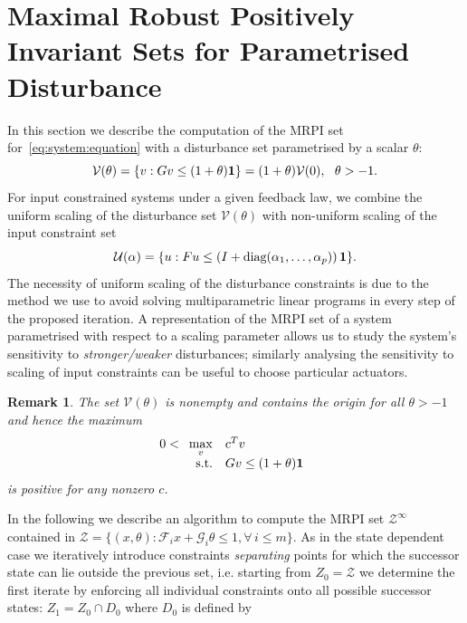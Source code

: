 \documentclass[letterpaper, 10pt, conference]{ieeeconf} %
\newtheorem{rem}[thm]{Remark}
\begin{document}
\section{Maximal Robust Positively Invariant Sets for Parametrised Disturbance}\label{sec:MRPI:parametrised}
%
%
In this section we describe the computation of the MRPI set for~\eqref{eq:system:equation} with a disturbance set parametrised by a scalar $\theta$:
\[
\mathcal V(\theta) = \{v: Gv\leq(1+\theta){\bf{1}}\} 
= (1+\theta)\mathcal V(0), \ \ \theta>-1.
\]
For input constrained systems under a given feedback law, we combine the uniform scaling of 
the disturbance set $\mathcal V(\theta)$ with non-uniform scaling of the input constraint set
\[
\mathcal U({\bf{\alpha}}) = \{u: Fu\leq\left(I+\text{diag}(\alpha_1,\dots,\alpha_p)\right){\bf{1}}\}.
\]
The necessity of uniform scaling of the disturbance constraints is due to the method we use to avoid
solving multiparametric linear programs in every step of the proposed iteration.
A representation of the MRPI set of a system parametrised with respect to a scaling parameter allows us
to study the system's sensitivity to \emph{stronger/weaker} disturbances; similarly analysing the sensitivity to scaling of input 
constraints can be useful to choose particular actuators.
%
\begin{rem}
The set $\mathcal V(\theta)$ is nonempty and contains the origin for all $\theta>-1$ and hence the 
maximum
%
\[
0<\begin{array}[t]{rl}
\displaystyle\max_v & c^T v\\
\text{s.t.}& Gv \leq (1+\theta){\bf{1}}
\end{array}
\]
%
is positive for any nonzero $c$.
\end{rem}
%
In the following we describe an algorithm to compute the MRPI set $\mathcal Z^\infty$ contained in 
$\mathcal Z = \{(x,\theta):\mathcal F_i x+\mathcal G_i\theta \leq 1,\forall\, i\leq m\}$.
As in the state dependent case we iteratively introduce constraints \emph{separating} points
for which the successor state can lie outside the previous set, i.e. starting from $Z_0 = \mathcal Z$
we determine the first iterate by enforcing all individual constraints onto all possible successor states:
$Z_1=Z_0\cap D_0$ where $D_0$ is defined by
%
\end{document}
